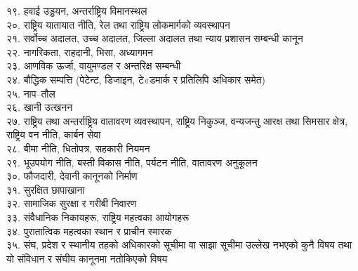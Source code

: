 १९. हवाई उड्डयन, अन्तर्राष्ट्रिय विमानस्थल\\
२०. राष्ट्रिय यातायात नीति, रेल तथा राष्ट्रिय लोकमार्गको व्यवस्थापन\\
२१. सर्वोच्च अदालत, उच्च अदालत, जिल्ला अदालत तथा न्याय प्रशासन सम्बन्धी कानून\\
२२. नागरिकता, राहदानी, भिसा, अध्यागमन\\
२३. आणविक ऊर्जा, वायुमण्डल र अन्तरिक्ष सम्बन्धी\\
२४. बौद्धिक सम्पत्ति (पेटेन्ट, डिजाइन, टे«डमार्क र प्रतिलिपि अधिकार समेत)\\
२५. नाप–तौल\\
२६. खानी उत्खनन\\
२७. राष्ट्रिय तथा अन्तर्राष्ट्रिय वातावरण व्यवस्थापन, राष्ट्रिय निकुञ्ज, वन्यजन्तु आरक्ष तथा सिमसार क्षेत्र, राष्ट्रिय वन नीति, कार्बन सेवा\\
२८. बीमा नीति, धितोपत्र, सहकारी नियमन\\
२९. भूउपयोग नीति, बस्ती विकास नीति, पर्यटन नीति, वातावरण अनुकूलन\\
३०. फौजदारी, देवानी कानूनको निर्माण\\
३१. सुरक्षित छापाखाना\\
३२. सामाजिक सुरक्षा र गरीबी निवारण\\
३३. संवैधानिक निकायहरू, राष्ट्रिय महत्वका आयोगहरू\\
३४. पुरातात्विक महत्वका स्थान र प्राचीन स्मारक\\
३५. संघ, प्रदेश र स्थानीय तहको अधिकारको सूचीमा वा साझा सूचीमा उल्लेख नभएको कुनै विषय तथा यो संविधान र संघीय कानूनमा नतोकिएको विषय\\
